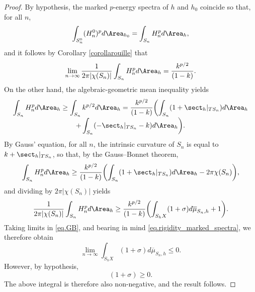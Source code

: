 \begin{proof}
By hypothesis, the marked $p$-energy spectra of $h$ and $h_0$ coincide so that, for all $n$,\vspace*{-3pt}
\begin{equation*}
\int_{S^0_n}(H_n^0)^p d\Area_{h_0}=\int_{S_n} H_n^p d\Area_{h},
\end{equation*}
and it follows by Corollary \ref{corollarouille} that\vspace*{-3pt}
\begin{equation}\label{eq.rigidity_marked_spectra}
\lim_{n\to\infty}\frac{1}{2\pi|\chi(S_n)|}\int_{S_n} H_n^p d\Area_{h}=\frac{k^{p/2}}{(1-k)}.
\end{equation}
On the other hand, the algebraic-geometric mean inequality yields\vspace*{-3pt}
\begin{multline*}
\int_{S_n} H_n^p d\Area_{h}\geq\int_{S_n} k^{p/2}d\Area_{h}=\frac{k^{p/2}}{(1-k)}\biggl(\int_{S_n}(1+\sect_h|_{TS_n})d\Area_{h}\\[-3pt]
+ \int_{S_n} (-\sect_h|_{TS_n} - k)d\Area_{h}\biggr).
\end{multline*}
By Gauss' equation, for all $n$, the intrinsic curvature of $S_n$ is equal to $k+\sect_h|_{TS_n}$, so that, by the Gauss--Bonnet theorem,\vspace*{-3pt}
\begin{equation*}
\int_{S_n} H_n^p d\Area_{h} \geq \frac{k^{p/2}}{(1-k)}\biggl(\int_{S_n}(1+\sect_h|_{TS_n})d\Area_{h} - 2\pi\chi(S_n)\biggr),
\end{equation*}
and dividing by $2\pi\left|\chi(S_n)\right|$ yields\vspace*{-3pt}
\begin{equation}\label{eq.GB}
\frac{1}{2\pi|\chi(S_n)|}\int_{S_n} H_n^p d\Area_{h}\geq \frac{k^{p/2}}{(1-k)}\biggl(\int_{S_hX}(1+\sigma)d\overline\mu_{S_n,h}+1\biggr).
\end{equation}
Taking limits in \eqref{eq.GB}, and bearing in mind \eqref{eq.rigidity_marked_spectra}, we therefore obtain\vspace*{-3pt}
\begin{equation*}
\lim_{n\to\infty}\int_{S_hX}(1+\sigma)d\overline\mu_{S_n,h}\leq 0.
\end{equation*}
However, by hypothesis,
\begin{equation*}
(1+\sigma)\geq 0.
\end{equation*}
The above integral is therefore also non-negative, and the result follows.
\end{proof}

